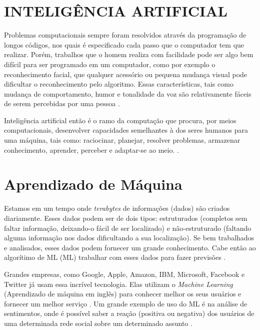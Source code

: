 \section{INTELIGÊNCIA ARTIFICIAL }
\label{sec:INTELIGÊNCIA ARTIFICIAL }

Problemas computacionais sempre foram resolvidos através da programação de
longos códigos, nos quais é especificado cada passo que o computador tem que realizar. Porém, trabalhos que o homem realiza com facilidade pode ser algo bem difícil para ser programado em um computador, como por exemplo o reconhecimento facial, que qualquer acessório ou pequena mudança visual pode dificultar o reconhecimento pelo algoritmo. Essas características, tais como mudança de comportamento, humor e tonalidade da voz são relativamente fáceis de serem percebidas por uma pessoa \cite{lorenafaceli2011inteligencia}. 

 
Inteligência artificial então é o ramo da computação que procura, por meios computacionais, desenvolver capacidades semelhantes à dos seres humanos para uma máquina, tais como: raciocinar, planejar, resolver problemas, armazenar conhecimento, aprender, perceber e adaptar-se ao meio. \cite{Fernando}.

\section{Aprendizado de Máquina}
\label{sec:aprendizado de máquina}

Estamos em um tempo onde \textit{terabytes} de informações (dados) são criados diariamente. Esses dados podem ser de dois tipos: estruturados (completos sem faltar informação, deixando-o fácil de ser localizado) e não-estruturado (faltando alguma informação nos dados dificultando a sua localização). Se bem trabalhados e analisados, esses dados podem fornecer um grande conhecimento. Cabe então ao algorítimo de \acrlong{ML} (ML) trabalhar com esses dados para fazer previsões \cite{pythonmachinelearning}. 

Grandes empresas, como Google, Apple, Amazon, IBM, Microsoft, Facebook e Twitter já usam essa incrível tecnologia. Elas utilizam o \textit{Machine Learning} (Aprendizado de máquina em inglês) para conhecer melhor os seus usuários e fornecer um melhor serviço \cite{pythonmachinelearning}. Um grande exemplo de uso do ML é na análise de sentimentos, onde é possível saber a reação (positiva ou negativa) dos usuários de uma determinada rede social sobre um determinado assunto \cite{sentimentos}.

